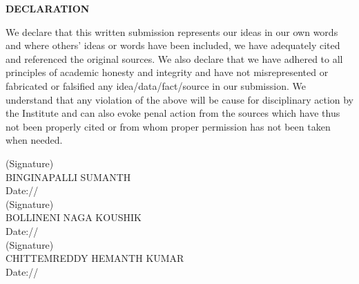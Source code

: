 \documentclass[10pt]{report}
\begin{document}
\newpage
\begin{center}
\Huge \textbf{DECLARATION}
\end{center}
\vspace{1.0cm}
\linespread{1.5}
\large{
We declare that this written submission represents our ideas in our own words and where others' ideas
or words have been included, we have adequately cited and referenced the original sources. We also
declare that we have adhered to all principles of academic honesty and integrity and have not
misrepresented or fabricated or falsified any idea/data/fact/source in our submission. We understand
that any violation of the above will be cause for disciplinary action by the Institute and can also evoke
penal action from the sources which have thus not been properly cited or from whom proper permission
has not been taken when needed.}
\vspace{2.0cm}
\begin{flushright}
(Signature)\\
\large{BINGINAPALLI SUMANTH}\\
\large{Date:\hspace*{1.0cm}/\hspace*{1.0cm}/}\\[2.0cm]
(Signature)\\
\large{BOLLINENI NAGA KOUSHIK}\\
\large{Date:\hspace*{1.0cm}/\hspace*{1.0cm}/}\\[2.0cm]
(Signature)\\
\large{CHITTEMREDDY HEMANTH KUMAR}\\
\large{Date:\hspace*{1.0cm}/\hspace*{1.0cm}/}\\[2.0cm]
\end{flushright}
\end{document}
